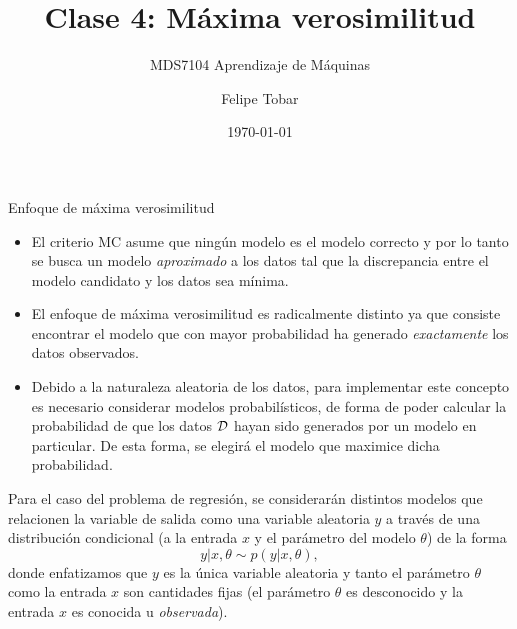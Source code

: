 \documentclass[handout, 9pt]{beamer}
\title{Clase 4: Máxima verosimilitud}
\subtitle{MDS7104 Aprendizaje de Máquinas}
\date{\today}
\author{Felipe Tobar}
\institute{Department of Mathematical Engineering \&\\ Center for Mathematical Modelling\\Universidad de Chile}
\begin{document}
\begin{frame}
  \titlepage
\end{frame}

\begin{frame}{Enfoque de máxima verosimilitud}

\begin{itemize}
	\item El criterio MC asume que ningún modelo es el modelo correcto y por lo tanto se busca un modelo \emph{aproximado} a los datos tal que la discrepancia entre el modelo candidato y los datos sea mínima.\pause
	\item El enfoque de máxima verosimilitud es radicalmente distinto ya que consiste encontrar el modelo que con mayor probabilidad ha generado \emph{exactamente} los datos observados.\pause
	\item Debido a la naturaleza aleatoria de los datos, para implementar este concepto es necesario considerar modelos probabilísticos, de forma de poder calcular la probabilidad de que los datos ${\mathcal D}$ hayan sido generados por un modelo en particular. De esta forma, se elegirá el modelo que maximice dicha probabilidad.\pause
\end{itemize}
	
Para el caso del problema de regresión, se considerarán distintos modelos que relacionen la variable de salida como una variable aleatoria $y$ a través de una distribución condicional (a la entrada $x$ y el parámetro del modelo $\theta$) de la forma 
\begin{equation*}
	y|x,\theta \sim p(y|x,\theta),\label{eq:mod_gen}
\end{equation*}
donde enfatizamos que $y$ es  la única variable aleatoria y tanto el parámetro $\theta$ como la entrada $x$ son cantidades fijas (el parámetro $\theta$ es desconocido y la entrada $x$ es conocida u \emph{observada}).
	
\end{frame}
\end{document}
